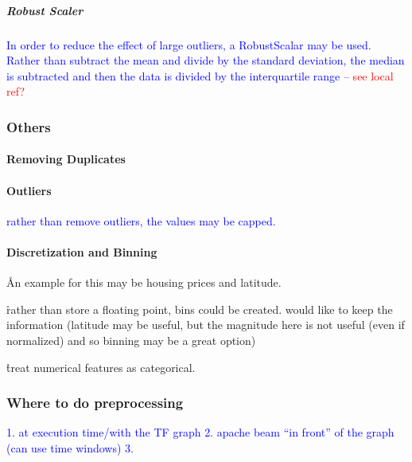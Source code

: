 \subparagraph{Robust Scaler}

\textcolor{blue}{In order to reduce the effect of large outliers, a \textcolor{blue}{RobustScalar} may be used. Rather than subtract the mean and divide by the standard deviation, the median is subtracted and then the data is divided by the {interquartile range} -- \textcolor{red}{see local ref?}}


\subsubsection{Others}

\paragraph{Removing Duplicates}

\paragraph{Outliers}

\textcolor{blue}{rather than remove outliers, the values may be capped.}

\paragraph{Discretization and Binning}

\r{An example for this may be housing prices and latitude.}


\r{rather than store a floating point, bins could be created. would like to keep the information (latitude may be useful, but the magnitude here is not useful (even if normalized) and so binning may be a great option)}

\r{treat numerical features as categorical.}


\subsubsection{Where to do preprocessing}

\textcolor{blue}{1. at execution time/with the TF graph}
\textcolor{blue}{2. apache beam ``in front'' of the graph (can use time windows)}
\textcolor{blue}{3. }




